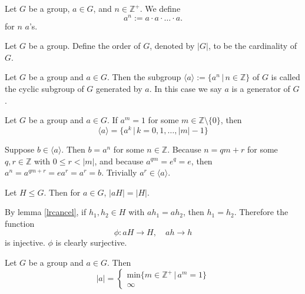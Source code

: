 \documentclass{article}
\begin{document}
\begin{defi}[Exponentials]
	Let \(G\) be a group, \(a\in G\), and \(n\in\mathbb{Z^+}\). We define
	\begin{equation*}
		a^n:=a\cdot a\cdot\ldots\cdot a.
	\end{equation*}
	for \(n\) \(a\)'s.
\end{defi}
\begin{defi}[Order]
	Let \(G\) be a group. Define the order of \(G\), denoted by \(\lvert G\rvert\), to be the cardinality of \(G\).
\end{defi}
\begin{defi}
	Let \(G\) be a group and \(a\in G\). Then the subgroup \(\langle a\rangle:=\{a^n\,|\,n\in\mathbb{Z}\}\) of \(G\) is called the cyclic subgroup of \(G\) generated by \(a\). In this case we say \(a\) is a generator of \(G\).
\end{defi}
\begin{lem}
	\label{generatorlem}
	Let \(G\) be a group and \(a\in G\). If \(a^m=1\) for some \(m\in\mathbb{Z}\setminus\{0\}\), then
	\begin{equation*}
		\langle a\rangle=\{a^k\,|\,k=0,1,\ldots,\lvert m\rvert-1\}
	\end{equation*}
	\begin{IEEEproof}
	Suppose \(b\in \langle a\rangle\). Then \(b=a^n\) for some \(n\in\mathbb{Z}\). Because \(n=qm+r\) for some \(q,r\in\mathbb{Z}\) with \(0\leq r<\lvert m\rvert\), and because \(a^{qm}=e^q=e\), then \(a^{n}=a^{qm+r}=ea^{r}=a^{r}=b\). Trivially \(a^r\in\langle a\rangle\).
	\end{IEEEproof}
\end{lem}
\begin{lem}
	\label{equinumerouscoset}
	Let \(H\leq G\). Then for \(a\in G\), \(\lvert aH\rvert=\lvert H\rvert\).
	\begin{IEEEproof}
		By lemma \ref{lrcancel}, if \(h_1,h_2\in H\) with \(ah_1=ah_2\), then \(h_1=h_2\). Therefore the function
		\begin{equation*}
			\phi:aH\rightarrow H,\quad ah\rightarrow h
		\end{equation*}
		is injective. \(\phi\) is clearly surjective.
	\end{IEEEproof}
\end{lem}
\begin{rema}
	Let \(G\) be a group and \(a\in G\). Then
	\begin{equation*}
		\lvert a\rvert=\begin{cases}
			\text{min}\{m\in\mathbb{Z}^{+}\,|\,a^m=1\}\\
			\infty
		\end{cases}
	\end{equation*}
\end{rema}
\end{document}
